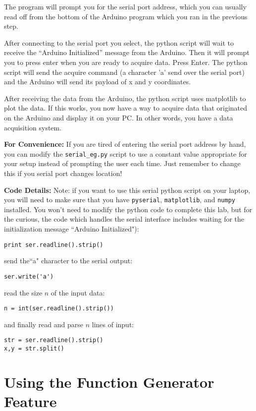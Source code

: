 \documentclass[12pt]{article}
\begin{document}
The program will prompt you for the serial port address, which you can usually read off from the bottom of the Arduino program which you ran in the previous step.

After connecting to the serial port you select, the python script will wait to
receive the ``Arduino Initialized'' message from the Arduino.  Then it will
prompt you to press enter when you are ready to acquire data.  Press Enter.  The
python script will send the acquire command (a character 'a' send over the
serial port) and the Arduino will send its payload of x and y coordinates.

After receiving the data from the Arduino, the python script uses matplotlib to
plot the data.  If this works, you now have a way to acquire data that
originated on the Arduino and display it on your PC.  In other words, you have a
data acquisition system.  

{\bf For Convenience:}  If you are tired of entering the serial port address by hand, you can modify the {\tt serial\_eg.py} script to use a constant value appropriate for your setup instead of prompting the user each time.   Just remember to change this if you serial port changes location!

{\bf Code Details:}  Note: if you want to use this serial python script on your laptop, you will
need to make sure that you have {\tt pyserial}, {\tt matplotlib}, and {\tt numpy} installed.  You won't need to modify the python code to complete this lab, but for the curious, the code which handles the serial interface includes waiting for the initialization message ``Arduino Initialized"):
\begin{verbatim}
print ser.readline().strip()
\end{verbatim}
send the``a" character to the serial output:
\begin{verbatim}
ser.write('a')
\end{verbatim}
read the size $n$ of the input data:
\begin{verbatim}
n = int(ser.readline().strip())
\end{verbatim}
and finally read and parse $n$ lines of input: 
\begin{verbatim}
str = ser.readline().strip()
x,y = str.split()
\end{verbatim}

\section{Using the Function Generator Feature}
\end{document}
